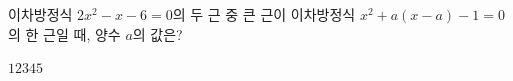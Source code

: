 이차방정식 $2x^2-x-6=0$의 두 근 중 큰 근이 이차방정식 $x^2+a(x-a)-1=0$의 한 근일 때, 양수 $a$의 값은?
\begin{choices32}{$1$}{$2$}{$3$}{$4$}{$5$}\end{choices32}
